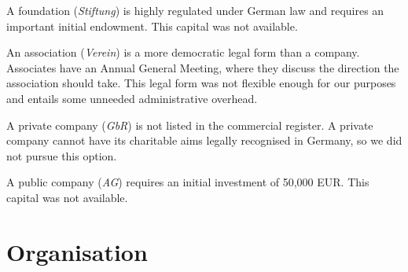 \documentclass[nonflat,smallfont
]{langsci/langscibook}
\newcommand{\othersolutions}[1]{
  \renewcommand{\tblslinecolour}{lsDarkGreenOne}
  \tblssy{more}{Other solutions}{\vspace*{-5mm}#1}
}
\renewcommand{\tblssy}[4][black!12]{%
  \renewcommand{\langscisymbol}{#2}\renewcommand{\tblsboxcolor}{#1}
  \begin{mdframed}[style=yellowexercise,frametitle={#3}]
    #4
  \end{mdframed}
}
\begin{document}
\othersolutions{
A foundation (\textit{Stiftung}) is highly regulated under German law and requires an important initial endowment. This capital was not available. 

An association (\textit{Verein}) is a more democratic legal form than a company. Associates have an Annual General Meeting, where they discuss the direction the association should take. This legal form was not flexible enough for our purposes and entails some unneeded administrative overhead. 

A private company (\textit{GbR}) is not listed in the  commercial register. A private company cannot have its charitable aims legally recognised in Germany, so we did not pursue this option. 

A public company (\textit{AG}) requires an initial investment of 50,000 EUR. This capital was not available. 
}
 

\section{Organisation}
\end{document}
